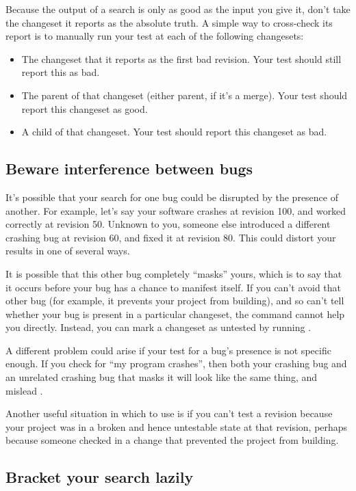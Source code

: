 Because the output of a  search is only as good as the
input you give it, don't take the changeset it reports as the
absolute truth.  A simple way to cross-check its report is to manually
run your test at each of the following changesets:
\begin{itemize}
\item The changeset that it reports as the first bad revision.  Your
  test should still report this as bad.
\item The parent of that changeset (either parent, if it's a merge).
  Your test should report this changeset as good.
\item A child of that changeset.  Your test should report this
  changeset as bad.
\end{itemize}

\subsection{Beware interference between bugs}

It's possible that your search for one bug could be disrupted by the
presence of another.  For example, let's say your software crashes at
revision 100, and worked correctly at revision 50.  Unknown to you,
someone else introduced a different crashing bug at revision 60, and
fixed it at revision 80.  This could distort your results in one of
several ways.

It is possible that this other bug completely ``masks'' yours, which
is to say that it occurs before your bug has a chance to manifest
itself.  If you can't avoid that other bug (for example, it prevents
your project from building), and so can't tell whether your bug is
present in a particular changeset, the  command cannot
help you directly.  Instead, you can mark a changeset as untested by
running .

A different problem could arise if your test for a bug's presence is
not specific enough.  If you check for ``my program crashes'', then
both your crashing bug and an unrelated crashing bug that masks it
will look like the same thing, and mislead .

Another useful situation in which to use  is
if you can't test a revision because your project was in a broken and
hence untestable state at that revision, perhaps because someone
checked in a change that prevented the project from building.

\subsection{Bracket your search lazily}

